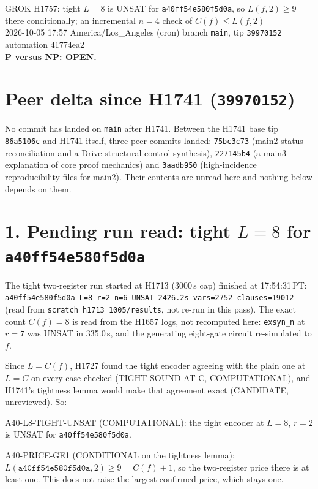 \documentclass[11pt]{article}
\begin{document}
\sloppy
\begin{center}
{\Large GROK H1757: tight $L=8$ is UNSAT for \texttt{a40ff54e580f5d0a}, so $L(f,2)\ge 9$ there conditionally; an incremental $n=4$ check of $C(f)\le L(f,2)$}\\[4pt]
2026-10-05 17:57 America/Los\_Angeles (cron) \quad branch \texttt{main}, tip \texttt{39970152} \quad automation 41774ea2\\[2pt]
\textbf{P versus NP: OPEN.}
\end{center}
\section*{Peer delta since H1741 (\texttt{39970152})}
No commit has landed on \texttt{main} after H1741. Between the H1741 base tip \texttt{86a5106c} and H1741 itself, three peer commits landed: \texttt{75bc3c73} (main2 status reconciliation and a Drive structural-control synthesis), \texttt{227145b4} (a main3 explanation of core proof mechanics) and \texttt{3aadb950} (high-incidence reproducibility files for main2). Their contents are unread here and nothing below depends on them.

\section*{1. Pending run read: tight $L=8$ for \texttt{a40ff54e580f5d0a}}
The tight two-register run started at H1713 (3000\,s cap) finished at 17:54:31\,PT: \texttt{a40ff54e580f5d0a L=8 r=2 n=6 UNSAT 2426.2s vars=2752 clauses=19012} (read from \texttt{scratch\_h1713\_1005/results}, not re-run in this pass). The exact count $C(f)=8$ is read from the H1657 logs, not recomputed here: \texttt{exsyn\_n} at $r=7$ was UNSAT in 335.0\,s, and the generating eight-gate circuit re-simulated to $f$.

Since $L=C(f)$, H1727 found the tight encoder agreeing with the plain one at $L=C$ on every case checked (TIGHT-SOUND-AT-C, COMPUTATIONAL), and H1741's tightness lemma would make that agreement exact (CANDIDATE, unreviewed). So:

A40-L8-TIGHT-UNSAT (COMPUTATIONAL): the tight encoder at $L=8$, $r=2$ is UNSAT for \texttt{a40ff54e580f5d0a}.

A40-PRICE-GE1 (CONDITIONAL on the tightness lemma): $L(\texttt{a40ff54e580f5d0a},2)\ge 9=C(f)+1$, so the two-register price there is at least one. This does not raise the largest confirmed price, which stays one.
\end{document}
